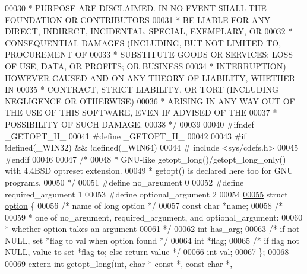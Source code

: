 \begin{DoxyCode}
00030 \textcolor{comment}{ * PURPOSE ARE DISCLAIMED.  IN NO EVENT SHALL THE FOUNDATION OR CONTRIBUTORS}
00031 \textcolor{comment}{ * BE LIABLE FOR ANY DIRECT, INDIRECT, INCIDENTAL, SPECIAL, EXEMPLARY, OR}
00032 \textcolor{comment}{ * CONSEQUENTIAL DAMAGES (INCLUDING, BUT NOT LIMITED TO, PROCUREMENT OF}
00033 \textcolor{comment}{ * SUBSTITUTE GOODS OR SERVICES; LOSS OF USE, DATA, OR PROFITS; OR BUSINESS}
00034 \textcolor{comment}{ * INTERRUPTION) HOWEVER CAUSED AND ON ANY THEORY OF LIABILITY, WHETHER IN}
00035 \textcolor{comment}{ * CONTRACT, STRICT LIABILITY, OR TORT (INCLUDING NEGLIGENCE OR OTHERWISE)}
00036 \textcolor{comment}{ * ARISING IN ANY WAY OUT OF THE USE OF THIS SOFTWARE, EVEN IF ADVISED OF THE}
00037 \textcolor{comment}{ * POSSIBILITY OF SUCH DAMAGE.}
00038 \textcolor{comment}{ */}
00039 
00040 \textcolor{preprocessor}{#ifndef \_GETOPT\_H\_}
00041 \textcolor{preprocessor}{#define \_GETOPT\_H\_}
00042 
00043 \textcolor{preprocessor}{#if !defined(\_WIN32) && !defined(\_WIN64)}
00044 \textcolor{preprocessor}{#   include <sys/cdefs.h>}
00045 \textcolor{preprocessor}{#endif}
00046 
00047 \textcolor{comment}{/*}
00048 \textcolor{comment}{ * GNU-like getopt\_long()/getopt\_long\_only() with 4.4BSD optreset extension.}
00049 \textcolor{comment}{ * getopt() is declared here too for GNU programs.}
00050 \textcolor{comment}{ */}
00051 \textcolor{preprocessor}{#define no\_argument        0}
00052 \textcolor{preprocessor}{#define required\_argument  1}
00053 \textcolor{preprocessor}{#define optional\_argument  2}
00054 
\hyperlink{structoption}{00055} \textcolor{keyword}{struct }\hyperlink{structoption}{option} \{
00056     \textcolor{comment}{/* name of long option */}
00057     \textcolor{keyword}{const} \textcolor{keywordtype}{char} *name;
00058     \textcolor{comment}{/*}
00059 \textcolor{comment}{     * one of no\_argument, required\_argument, and optional\_argument:}
00060 \textcolor{comment}{     * whether option takes an argument}
00061 \textcolor{comment}{     */}
00062     \textcolor{keywordtype}{int} has\_arg;
00063     \textcolor{comment}{/* if not NULL, set *flag to val when option found */}
00064     \textcolor{keywordtype}{int} *flag;
00065     \textcolor{comment}{/* if flag not NULL, value to set *flag to; else return value */}
00066     \textcolor{keywordtype}{int} val;
00067 \};
00068 
00069 \textcolor{keyword}{extern} \textcolor{keywordtype}{int}  getopt\_long(\textcolor{keywordtype}{int}, \textcolor{keywordtype}{char} * \textcolor{keyword}{const} *, \textcolor{keyword}{const} \textcolor{keywordtype}{char} *,

\end{DoxyCode}
